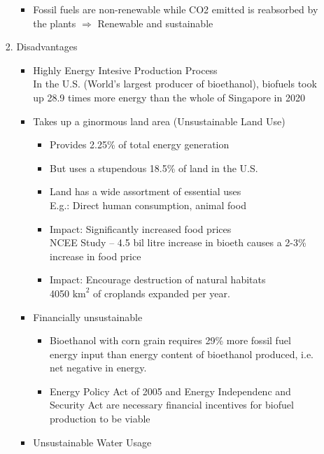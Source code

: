 \documentclass[oneside]{book}
\begin{document}
\begin{enumerate}
\begin{enumerate}
\begin{enumerate}
\begin{itemize}
                \item Fossil fuels are non-renewable while CO2 emitted is reabsorbed by the plants \( \Rightarrow \) Renewable and sustainable
            \end{itemize}
            \item Disadvantages \begin{itemize}
                \item Highly Energy Intesive Production Process\\[2mm] In the U.S. (World's largest producer of bioethanol), biofuels took up 28.9 times more energy than the whole of Singapore in 2020
                \item Takes up a ginormous land area (Unsustainable Land Use)\\[2mm]
                \begin{itemize}
                    \item Provides 2.25\% of total energy generation
                    \item But uses a stupendous 18.5\% of land in the U.S.
                    \item Land has a wide assortment of essential uses\\[2mm]
                    E.g.: Direct human consumption, animal food
                    \item Impact: Significantly increased food prices\\[2mm]
                    NCEE Study – 4.5 bil litre increase in bioeth causes a 2-3\% increase in food price
                    \item Impact: Encourage destruction of natural habitats\\[2mm]
                    4050 \(\text{km}^2\) of croplands expanded per year.
                \end{itemize}
                \item Financially unsustainable \begin{itemize}
                    \item Bioethanol with corn grain requires 29\% more fossil fuel energy input than energy content of bioethanol produced, i.e. net negative in energy.
                    \item Energy Policy Act of 2005 and Energy Independenc and Security Act are necessary financial incentives for biofuel production to be viable
                \end{itemize}
                \item Unsustainable Water Usage \begin{itemize}

\end{itemize}
\end{itemize}
\end{enumerate}
\end{enumerate}
\end{enumerate}
\end{document}
